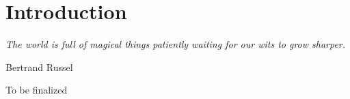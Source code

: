 \chapter{Introduction}
\epigraph{\emph{The world is full of magical things patiently waiting for our wits to grow sharper.}}{Bertrand Russel}

To be finalized

\clearpage
%

%  
